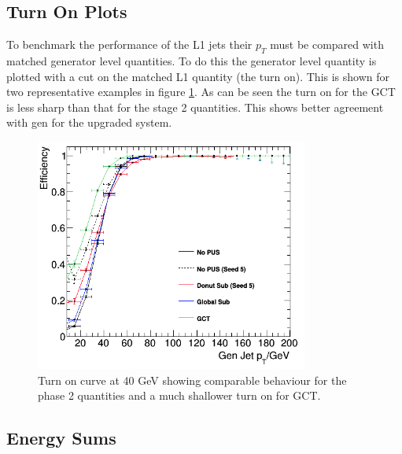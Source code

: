 \subsection{Turn On Plots}

To benchmark the performance of the L1 jets their $p_T$ must be compared with matched generator level quantities. To do this the generator level quantity is plotted with a cut on the matched L1 quantity (the turn on). This is shown for two representative examples in figure \ref{turnon}. As can be seen the turn on for the GCT is less sharp than that for the stage 2 quantities. This shows better agreement with gen for the upgraded system.
\begin{figure}
\centering
    \includegraphics[width=0.8\textwidth]{Figures/jet4_40}
  \caption{Turn on curve at 40 GeV showing comparable behaviour for the phase 2 quantities and a much shallower turn on for GCT.}
  \label{turnon}
\end{figure}
\subsection{Energy Sums}

